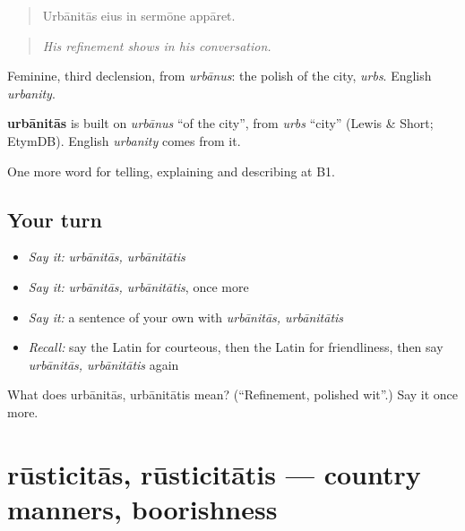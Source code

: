 \begin{quote}
Urbānitās eius in sermōne appāret.
\end{quote}

\begin{quote}
\emph{His refinement shows in his conversation.}
\end{quote}

Feminine, third declension, from \emph{urbānus}: the polish of the city, \emph{urbs}. English \emph{urbanity}.

\begin{cousinweb}
\textbf{urbānitās} is built on \emph{urbānus} \textquotedblleft{}of the city\textquotedblright{}, from \emph{urbs} \textquotedblleft{}city\textquotedblright{} (Lewis \& Short; EtymDB). English \emph{urbanity} comes from it.
\end{cousinweb}

\begin{grammarlens}[title={What you've built}]
One more word for telling, explaining and describing at B1.
\end{grammarlens}

\subsection*{Your turn}
\begin{itemize}
\raggedright
  \item \emph{Say it:} \emph{urbānitās, urbānitātis}
  \item \emph{Say it:} \emph{urbānitās, urbānitātis}, once more
  \item \emph{Say it:} a sentence of your own with \emph{urbānitās, urbānitātis}
  \item \emph{Recall:} say the Latin for courteous, then the Latin for friendliness, then say \emph{urbānitās, urbānitātis} again
\end{itemize}

\begin{tcolorbox}[breakable,colback=teal!4,colframe=teal!35!black,title={Before you move on}]
What does urbānitās, urbānitātis mean? (\textquotedblleft{}Refinement, polished wit\textquotedblright{}.) Say it once more.
\end{tcolorbox}
\section[rūsticitās, rūsticitātis]{rūsticitās, rūsticitātis — country manners, boorishness}

\label{lesson:LA-C506-rusticitas}



